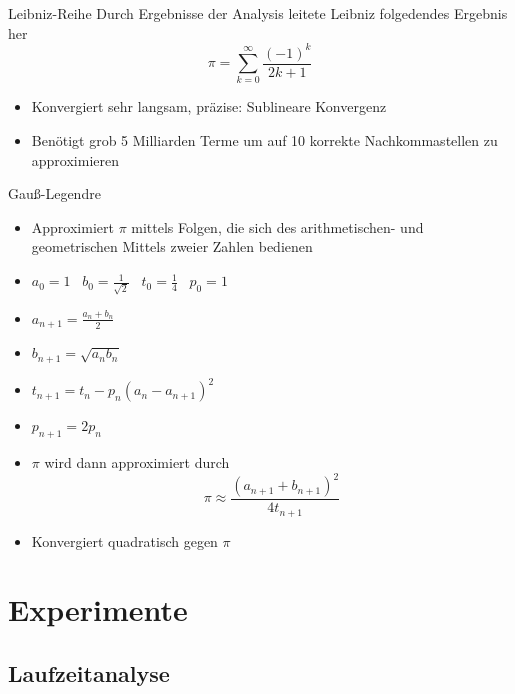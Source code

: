 \documentclass[9pt, t]{beamer}
\begin{document}
\begin{frame}{Leibniz-Reihe}
    Durch Ergebnisse der Analysis leitete Leibniz folgedendes Ergebnis her \cite{Leibniz}
    \[ \pi = \sum_{k=0}^{\infty} \frac{(-1)^k}{2k+1} \]
    \begin{itemize}
        \item<3-> Konvergiert sehr langsam, präzise: Sublineare Konvergenz \\
        \item<3-> Benötigt grob 5 Milliarden Terme um auf 10 korrekte Nachkommastellen zu approximieren
    \end{itemize}
\end{frame}

\begin{frame}{Gauß-Legendre}                                                                                                        %
    \begin{itemize}
        \item<1-> Approximiert \(\pi\) mittels Folgen, die sich des arithmetischen- und geometrischen Mittels zweier Zahlen bedienen
        \item<2-> \( a_0 = 1 \;\;\; b_0 = \frac{1}{\sqrt{2}} \;\;\; t_0 = \frac{1}{4} \;\;\; p_0 = 1 \)
        \item<3-> \( a_{n+1} = \frac{a_n + b_n}{2} \)
        \item<4-> \( b_{n+1} = \sqrt{a_nb_n} \)
        \item<5-> \( t_{n+1} = t_n - p_n(a_n - a_{n+1})^2 \)
        \item<6-> \( p_{n+1} = 2p_n \)
        \item<7-> \(\pi\) wird dann approximiert durch \[ \pi \approx \frac{(a_{n+1} + b_{n+1})^2}{4t_{n+1}} \]
        \item<8-> Konvergiert quadratisch gegen \(\pi\) \cite{Gauß-Legendre}
    \end{itemize}
\end{frame}

\section{Experimente}

\subsection{Laufzeitanalyse}
\end{document}
